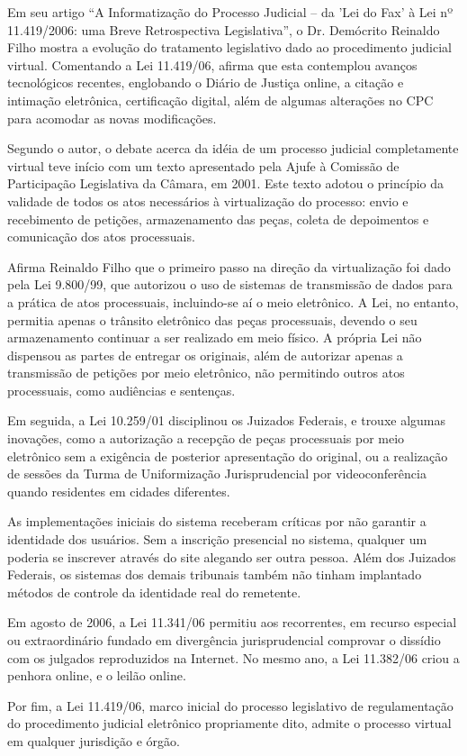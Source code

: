 	Em seu artigo “A Informatização do Processo Judicial – da 'Lei
  do Fax' à Lei nº 11.419/2006: uma Breve Retrospectiva
      Legislativa”, o Dr. Demócrito Reinaldo Filho mostra a
      evolução do tratamento legislativo dado ao procedimento
      judicial virtual. Comentando a Lei 11.419/06, afirma que
      esta contemplou avanços tecnológicos recentes, englobando o
      Diário de Justiça online, a citação e intimação eletrônica,
      certificação digital, além de algumas alterações no CPC
      para acomodar as novas modificações.\par
	
	Segundo o autor, o debate acerca da idéia de um processo
  judicial completamente virtual teve início com um texto
  apresentado pela Ajufe à Comissão de Participação Legislativa
  da Câmara, em 2001. Este texto adotou o princípio da validade
  de todos os atos necessários à virtualização do processo: envio
  e recebimento de petições, armazenamento das peças, coleta de
  depoimentos e comunicação dos atos processuais.\par
	
	Afirma Reinaldo Filho que o primeiro passo na direção da
  virtualização foi dado pela Lei 9.800/99, que autorizou o uso
  de sistemas de transmissão de dados para a prática de atos
  processuais, incluindo-se aí o meio eletrônico. A Lei, no
  entanto, permitia apenas o trânsito eletrônico das peças
  processuais, devendo o seu armazenamento continuar a ser
  realizado em meio físico. A própria Lei não dispensou as partes
  de entregar os originais, além de autorizar apenas a
  transmissão de petições por meio eletrônico, não permitindo
  outros atos processuais, como audiências e sentenças.\par
	
	Em seguida, a Lei 10.259/01 disciplinou os Juizados Federais, e
  trouxe algumas inovações, como a autorização a recepção de
  peças processuais por meio eletrônico sem a exigência de
  posterior apresentação do original, ou a realização de sessões
  da Turma de Uniformização Jurisprudencial por videoconferência
  quando residentes em cidades diferentes. \par
	
	As implementações iniciais do sistema receberam críticas por
  não garantir a identidade dos usuários. Sem a inscrição
  presencial no sistema, qualquer um poderia se inscrever através
  do site alegando ser outra pessoa. Além dos Juizados Federais,
      os sistemas dos demais tribunais também não tinham
      implantado métodos de controle da identidade real do
      remetente.\par
	
	Em agosto de 2006, a Lei 11.341/06 permitiu aos recorrentes, em
  recurso especial ou extraordinário fundado em divergência
  jurisprudencial comprovar o dissídio com os julgados
  reproduzidos na Internet. No mesmo ano, a Lei 11.382/06 criou a
  penhora online, e o leilão online. \par
	
	Por fim, a Lei 11.419/06, marco inicial do processo legislativo
  de regulamentação do procedimento judicial eletrônico
  propriamente dito, admite o processo virtual em qualquer
  jurisdição e órgão. \par
